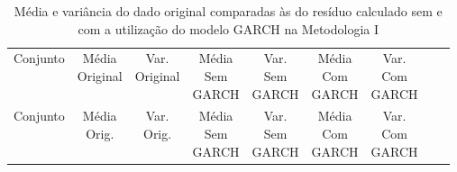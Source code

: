 \clearpage

\begin{center}
\begin{longtable}{ccccccccc}
\toprule
\rowcolor{white}
\caption[Metodologia I: dados estatísticos]{Média e variância do dado original
comparadas às do resíduo calculado sem e com a utilização do modelo GARCH na
Metodologia I} \label{tab:DadosEstatisticosMet1}\\
\midrule
    Conjunto & \specialcell{Média\\Original} &
    \specialcell{Var.\\Original} & \specialcell{Média\\Sem\\GARCH} &
    \specialcell{Var.\\Sem\\GARCH} & \specialcell{Média\\Com\\GARCH}&
    \specialcell{Var.\\Com\\GARCH} \\

\midrule
\endfirsthead 
\midrule
\rowcolor{white}
    Conjunto & \specialcell{Média\\Orig.} &
    \specialcell{Var.\\Orig.} & \specialcell{Média\\Sem\\GARCH} &
    \specialcell{Var.\\Sem\\GARCH} & \specialcell{Média\\Com\\GARCH}&
    \specialcell{Var.\\Com\\GARCH} \\


\end{longtable}
\end{center}
